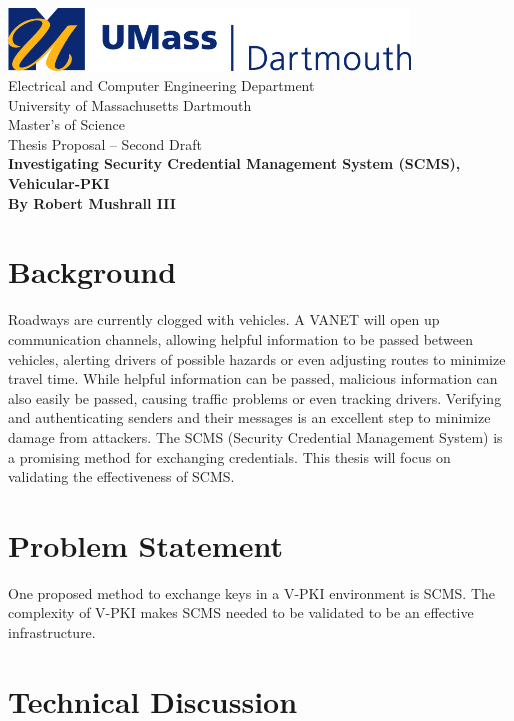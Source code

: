 \documentclass [11pt]{article}
\begin{document}
\begin{titlepage}
	\centering
	\includegraphics[width=0.8\textwidth]{images/umd_logo.jpg} \\ \bigskip
	\LARGE{Electrical and Computer Engineering Department \\University of Massachusetts Dartmouth}\\
	\bigskip \bigskip \bigskip
	\LARGE{Master's of Science \\ Thesis Proposal -- Second Draft} \\
	\bigskip \bigskip \bigskip
	\LARGE{\bf Investigating Security Credential Management System (SCMS), Vehicular-PKI} \\ \medskip
	\LARGE{\bf By Robert Mushrall III}

	\thispagestyle{empty}
\end{titlepage}
\setcounter{page}{2}

\tableofcontents
\pagebreak

\section{Background}

Roadways are currently clogged with vehicles. A VANET will open up communication channels, allowing helpful information to be passed between vehicles, alerting drivers of possible hazards or even adjusting routes to minimize travel time. While helpful information can be passed, malicious information can also easily be passed, causing traffic problems or even tracking drivers. Verifying and authenticating senders and their messages is an excellent step to minimize damage from attackers. The SCMS (Security Credential Management System) is a promising method for exchanging credentials. This thesis will focus on validating the effectiveness of SCMS.

\section{Problem Statement}

One proposed method to exchange keys in a V-PKI environment is SCMS. The complexity of V-PKI makes SCMS needed to be validated to be an effective infrastructure.

\section{Technical Discussion}
\end{document}
